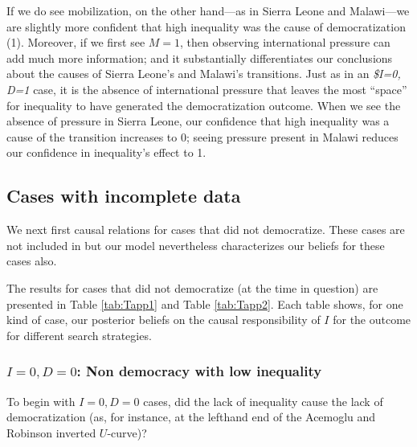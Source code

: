 \documentclass[
  12pt,
]{book}
\begin{document}
If we do see mobilization, on the other hand---as in Sierra Leone and Malawi---we are slightly more confident that high inequality was the cause of democratization (1). Moreover, if we first see \(M=1\), then observing international pressure can add much more information; and it substantially differentiates our conclusions about the causes of Sierra Leone's and Malawi's transitions. Just as in an \emph{\$I=0, D=1} case, it is the absence of international pressure that leaves the most ``space'' for inequality to have generated the democratization outcome. When we see the absence of pressure in Sierra Leone, our confidence that high inequality was a cause of the transition increases to 0; seeing pressure present in Malawi reduces our confidence in inequality's effect to 1.

\hypertarget{cases-with-incomplete-data}{%
\subsection{Cases with incomplete data}\label{cases-with-incomplete-data}}

We next first causal relations for cases that did not democratize. These cases are not included in \citet{haggard2012inequality} but our model nevertheless characterizes our beliefs for these cases also.

The results for cases that did not democratize (at the time in question) are presented in Table \ref{tab:Tapp1} and Table \ref{tab:Tapp2}. Each table shows, for one kind of case, our posterior beliefs on the causal responsibility of \(I\) for the outcome for different search strategies.

\hypertarget{i0-d0-non-democracy-with-low-inequality}{%
\subsubsection{\texorpdfstring{\(I=0, D=0\): Non democracy with low inequality}{I=0, D=0: Non democracy with low inequality}}\label{i0-d0-non-democracy-with-low-inequality}}

To begin with \(I=0, D=0\) cases, did the lack of inequality cause the lack of democratization (as, for instance, at the lefthand end of the Acemoglu and Robinson inverted \(U\)-curve)?
\end{document}
